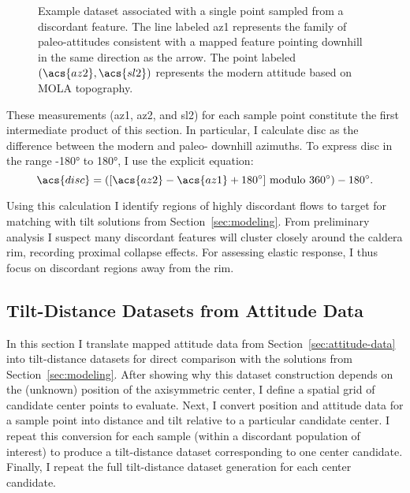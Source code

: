 \begin{figure}
    {\caption[Attitude data collected at sampled points]{
        Example dataset associated with a single point sampled from a discordant feature. The line labeled \acs{az1} represents the family of paleo-attitudes consistent with a mapped feature pointing downhill in the same direction as the arrow. The point labeled $(\acs{az2},\acs{sl2})$ represents the modern attitude based on \ac{MOLA} topography.
    }\label{fig:attitude-data}}
    {}
\end{figure}

These measurements (\acf{az1}, \acf{az2}, and \acf{sl2}) for each sample point constitute the first intermediate product of this section. In particular, I calculate \acl{disc} as the difference between the modern and paleo- downhill azimuths. To express \ac{disc} in the range \ang{-180} to \ang{180}, I use the explicit equation:
\begin{equation}
    \acs{disc} = ([\acs{az2} - \acs{az1} + \ang{180}] \text{ modulo } \ang{360}) - \ang{180}.
\end{equation}

Using this calculation I identify regions of highly discordant flows to target for matching with tilt solutions from Section~\ref{sec:modeling}. From preliminary analysis I suspect many discordant features will cluster closely around the caldera rim, recording proximal collapse effects. For assessing elastic response, I thus focus on discordant regions away from the rim.

\subsection{Tilt-Distance Datasets from Attitude Data}\label{sec:tilt-from-map}

In this section I translate mapped attitude data from Section~\ref{sec:attitude-data} into tilt-distance datasets for direct comparison with the solutions from Section~\ref{sec:modeling}. After showing why this dataset construction depends on the (unknown) position of the axisymmetric center, I define a spatial grid of candidate center points to evaluate. Next, I convert position and attitude data for a sample point into distance and tilt relative to a particular candidate center. I repeat this conversion for each sample (within a discordant population of interest) to produce a tilt-distance dataset corresponding to one center candidate. Finally, I repeat the full tilt-distance dataset generation for each center candidate.

